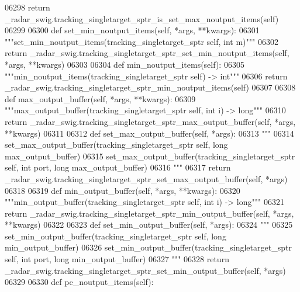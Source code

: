 \begin{DoxyCode}
{{{{{{{{{{{{{{{{{{{{{06298         \textcolor{keywordflow}{return} \_radar\_swig.tracking\_singletarget\_sptr\_is\_set\_max\_noutput\_items(self)
06299 
06300     \textcolor{keyword}{def }set_min_noutput_items(self, *args, **kwargs):
06301         \textcolor{stringliteral}{"""set\_min\_noutput\_items(tracking\_singletarget\_sptr self, int m)"""}
06302         \textcolor{keywordflow}{return} \_radar\_swig.tracking\_singletarget\_sptr\_set\_min\_noutput\_items(self, *args, **kwargs)
06303 
06304     \textcolor{keyword}{def }min_noutput_items(self):
06305         \textcolor{stringliteral}{"""min\_noutput\_items(tracking\_singletarget\_sptr self) -> int"""}
06306         \textcolor{keywordflow}{return} \_radar\_swig.tracking\_singletarget\_sptr\_min\_noutput\_items(self)
06307 
06308     \textcolor{keyword}{def }max_output_buffer(self, *args, **kwargs):
06309         \textcolor{stringliteral}{"""max\_output\_buffer(tracking\_singletarget\_sptr self, int i) -> long"""}
06310         \textcolor{keywordflow}{return} \_radar\_swig.tracking\_singletarget\_sptr\_max\_output\_buffer(self, *args, **kwargs)
06311 
06312     \textcolor{keyword}{def }set_max_output_buffer(self, *args):
06313         \textcolor{stringliteral}{"""}
06314 \textcolor{stringliteral}{        set\_max\_output\_buffer(tracking\_singletarget\_sptr self, long max\_output\_buffer)}
06315 \textcolor{stringliteral}{        set\_max\_output\_buffer(tracking\_singletarget\_sptr self, int port, long max\_output\_buffer)}
06316 \textcolor{stringliteral}{        """}
06317         \textcolor{keywordflow}{return} \_radar\_swig.tracking\_singletarget\_sptr\_set\_max\_output\_buffer(self, *args)
06318 
06319     \textcolor{keyword}{def }min_output_buffer(self, *args, **kwargs):
06320         \textcolor{stringliteral}{"""min\_output\_buffer(tracking\_singletarget\_sptr self, int i) -> long"""}
06321         \textcolor{keywordflow}{return} \_radar\_swig.tracking\_singletarget\_sptr\_min\_output\_buffer(self, *args, **kwargs)
06322 
06323     \textcolor{keyword}{def }set_min_output_buffer(self, *args):
06324         \textcolor{stringliteral}{"""}
06325 \textcolor{stringliteral}{        set\_min\_output\_buffer(tracking\_singletarget\_sptr self, long min\_output\_buffer)}
06326 \textcolor{stringliteral}{        set\_min\_output\_buffer(tracking\_singletarget\_sptr self, int port, long min\_output\_buffer)}
06327 \textcolor{stringliteral}{        """}
06328         \textcolor{keywordflow}{return} \_radar\_swig.tracking\_singletarget\_sptr\_set\_min\_output\_buffer(self, *args)
06329 
06330     \textcolor{keyword}{def }pc_noutput_items(self):
}}}}}}}}}}}}}}}}}}}}}
\end{DoxyCode}

